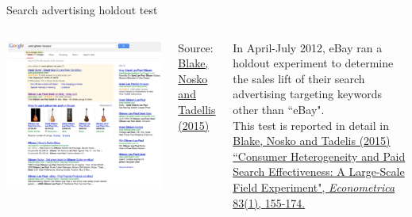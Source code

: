 \documentclass[10pt, aspectratio=169]{beamer}
\newcommand{\source}[1]{\begin{flushright} \footnotesize Source: {#1} \end{flushright} \normalsize}
\begin{document}
\begin{frame}{Search advertising holdout test}
\begin{columns}
\includegraphics[height=0.8\textheight]{images/lespaul.png}
\source{\href{https://drive.google.com/uc?export=download&id=0B0EzanlzLNsWU1BkWnFxZlZuZUE}{Blake, Nosko and Tadellis (2015)}}
In April-July 2012, eBay ran a holdout experiment to determine the sales lift of their search advertising targeting keywords other than ``eBay". \\
\bigskip
This test is reported in detail in \href{https://drive.google.com/uc?export=download&id=0B0EzanlzLNsWcUR6Y3dJVGlIazA}{Blake, Nosko and Tadelis (2015) ``Consumer Heterogeneity and Paid Search Effectiveness: A Large-Scale Field Experiment", \textit{Econometrica} 83(1), 155-174.}
\end{columns}
\end{frame}
\end{document}
